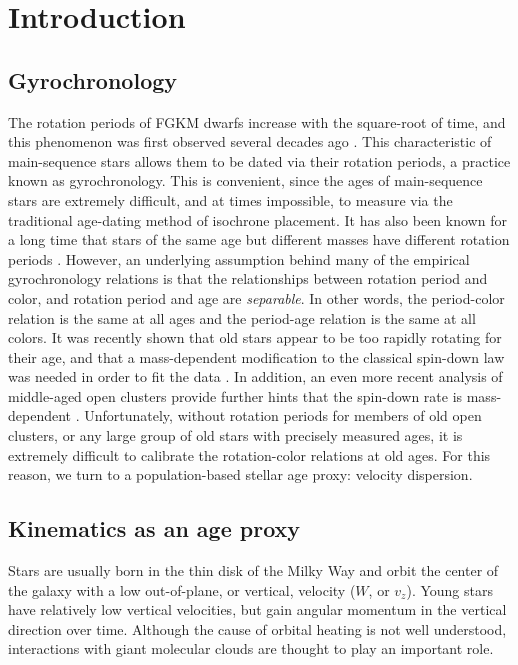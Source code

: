 \section{Introduction}

\subsection{Gyrochronology}
The rotation periods of FGKM dwarfs increase with the square-root of time, and
this phenomenon was first observed several decades ago \citep{skumanich1972}.
This characteristic of main-sequence stars allows them to be dated via their
rotation periods, a practice known as gyrochronology.
This is convenient, since the ages of main-sequence stars are extremely
difficult, and at times impossible, to measure via the traditional age-dating
method of isochrone placement.
It has also been known for a long time that stars of the same age but
different masses have different rotation periods .
However, an underlying assumption behind many of the empirical gyrochronology
relations \citep[\eg][]{barnes2003, barnes2007, mamajek2008, meibom2011,
angus2015, angus2019} is that the relationships between rotation period and
color, and rotation period and age are {\it separable}.
In other words, the period-color relation is the same at all ages and the
period-age relation is the same at all colors.
It was recently shown that old stars appear to be too rapidly rotating for
their age, \citep{angus2015, vansaders2016, vansaders2018} and that a
mass-dependent modification to the classical \citet{skumanich1972} spin-down
law was needed in order to fit the data \citep{vansaders2016, vansaders2018}.
In addition, an even more recent analysis of middle-aged open clusters provide
further hints that the spin-down rate is mass-dependent \citep{curtis2019}.
Unfortunately, without rotation periods for members of old open clusters, or
any large group of old stars with precisely measured ages, it is extremely
difficult to calibrate the rotation-color relations at old ages.
For this reason, we turn to a population-based stellar age proxy: velocity
dispersion.

\subsection{Kinematics as an age proxy}

Stars are usually born in the thin disk of the Milky Way and orbit the center
of the galaxy with a low out-of-plane, or vertical, velocity ($W$, or $v_z$).
Young stars have relatively low vertical velocities, but gain angular momentum
in the vertical direction over time.
Although the cause of orbital heating is not well understood, interactions
with giant molecular clouds are thought to play an important role.

